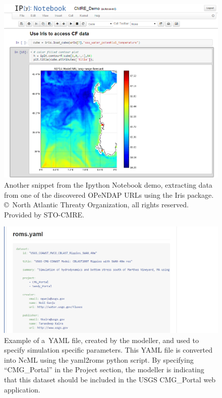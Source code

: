 \documentclass[osd, online, hvmath]{copernicus}
\begin{document}
\begin{figure}
\includegraphics[width=130mm]{os-2015-64-discussions-f06.png}
\caption{Another snippet from the Ipython Notebook demo, extracting
  data from one of the discovered OPeNDAP URLs using the Iris
  package. \copyright~North Atlantic Threaty Organization, all rights reserved. Provided by STO-CMRE.}
\label{osd-2015-0064-f06.pdf}
\end{figure}

\begin{figure}
\includegraphics[width=140mm]{os-2015-64-discussions-f07.png}
\caption{Example of a~YAML file, created by the modeller, and used to
  specify simulation specific parameters. This YAML file is converted
  into NcML using the yaml2roms python script. By specifying
  ``CMG\_Portal'' in the Project section, the modeller is indicating
  that this dataset should be included in the USGS CMG\_Portal web
  application.}
\label{osd-2015-0064-f07.pdf}
\end{figure}
\end{document}
